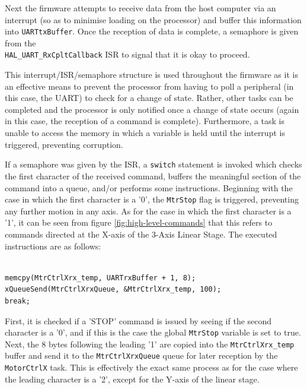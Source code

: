 Next the firmware attempts to receive data from the host computer via an interrupt (so as to minimise loading on the processor) and buffer this information into \verb|UARTtxBuffer|. Once the reception of data is complete, a semaphore is given from the \\\verb|HAL_UART_RxCpltCallback| ISR to signal that it is okay to proceed.

This interrupt/ISR/semaphore structure is used throughout the firmware as it is an effective means to prevent the processor from having to poll a peripheral (in this case, the UART) to check for a change of state. Rather, other tasks can be completed and the processor is only notified once a change of state occurs (again in this case, the reception of a command is complete). Furthermore, a task is unable to access the memory in which a variable is held until the interrupt is triggered, preventing corruption.

If a semaphore was given by the ISR, a \verb|switch| statement is invoked which checks the first character of the received command, buffers the meaningful section of the command into a queue, and/or performs some instructions. Beginning with the case in which the first character is a '0', the \verb|MtrStop| flag is triggered, preventing any further motion in any axis. As for the case in which the first character is a '1', it can be seen from figure \ref{fig:high-level-commands} that this refers to commands directed at the X-axis of the 3-Axis Linear Stage. The executed instructions are as follows:

\begin{listing}
\begin{verbatim}

memcpy(MtrCtrlXrx_temp, UARTrxBuffer + 1, 8);
xQueueSend(MtrCtrlXrxQueue, &MtrCtrlXrx_temp, 100);
break;

\end{verbatim}
\label{listing:1}
\end{listing}

First, it is checked if a 'STOP' command is issued by seeing if the second character is a '0', and if this is the case the global \verb|MtrStop| variable is set to true. Next, the 8 bytes following the leading '1' are copied into the \verb|MtrCtrlXrx_temp| buffer and send it to the \verb|MtrCtrlXrxQueue| queue for later reception by the \verb|MotorCtrlX| task. This is effectively the exact same process as for the case where the leading character is a '2', except for the Y-axis of the linear stage.

